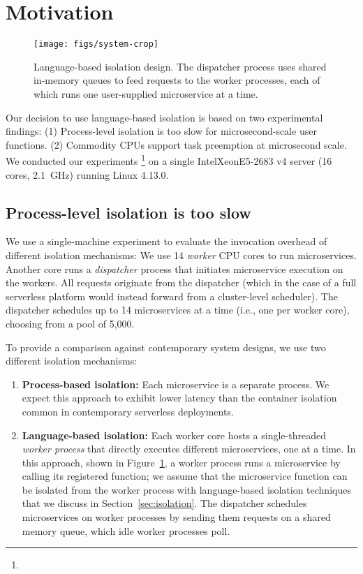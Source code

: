 \section{Motivation}
\label{sec:motive}

\begin{figure}
\texttt{[image: figs/system-crop]}
\caption{Language-based isolation design.  The dispatcher process
uses shared in-memory queues to feed requests to the worker processes, each of
which runs one user-supplied microservice at a time.}
\label{fig:sysdesign}
\end{figure}

Our decision to use language-based isolation is based on two experimental
findings:  (1) Process-level isolation is too slow for
microsecond-scale user functions. (2) Commodity
CPUs support task preemption at microsecond scale.  We conducted our experiments
\footnote{}
on a single Intel\textcopyright\@ Xeon\textcopyright\@ E5-2683 v4 server (16 cores, 2.1~GHz) running
Linux 4.13.0.

\subsection{Process-level isolation is too slow}
We use a single-machine experiment to evaluate the invocation overhead of different
isolation mechanisms: We use 14 \emph{worker} CPU cores to run microservices. Another
core runs a \emph{dispatcher} process that initiates microservice execution on the
workers.  All requests originate
from the dispatcher (which in the case of a full serverless platform would instead
forward from a cluster-level scheduler).  The dispatcher schedules up to 14
microservices at a time (i.e., one per worker core), choosing from a pool of 5,000.

To provide a comparison against contemporary system designs, we use two different
isolation mechanisms:
\begin{enumerate}
\item \textbf{Process-based isolation:} Each microservice is a separate process.
We expect this approach to exhibit lower latency than the container isolation common
in contemporary serverless deployments.
\item \textbf{Language-based isolation:} Each worker core hosts a single-threaded
\emph{worker process} that directly executes different microservices, one at a time.
In this approach, shown in Figure~\ref{fig:sysdesign}, a worker process runs a
microservice by calling its registered
function; we assume that the microservice function can be isolated from the
worker process with language-based isolation techniques that we discuss in
Section~\ref{sec:isolation}. The dispatcher schedules microservices on worker
processes by sending them
requests on a shared memory queue, which idle worker processes poll.
\end{enumerate}

